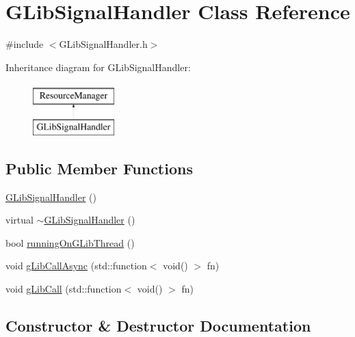 \hypertarget{classGLibSignalHandler}{}\section{G\+Lib\+Signal\+Handler Class Reference}
\label{classGLibSignalHandler}


{\ttfamily \#include $<$G\+Lib\+Signal\+Handler.\+h$>$}

Inheritance diagram for G\+Lib\+Signal\+Handler\+:\begin{figure}[H]
\begin{center}
\leavevmode
\includegraphics[height=2.000000cm]{classGLibSignalHandler}
\end{center}
\end{figure}
\subsection*{Public Member Functions}
\begin{DoxyCompactItemize}
\item 
\mbox{\hyperlink{classGLibSignalHandler_ae99630e0eb20b2f755187a48dcc9b814}{G\+Lib\+Signal\+Handler}} ()
\item 
virtual \mbox{\hyperlink{classGLibSignalHandler_a026fd58f52f4b6a3cc51bf0a329d89fe}{$\sim$\+G\+Lib\+Signal\+Handler}} ()
\item 
bool \mbox{\hyperlink{classGLibSignalHandler_a9456898f16d7cb736a591099187637e4}{running\+On\+G\+Lib\+Thread}} ()
\item 
void \mbox{\hyperlink{classGLibSignalHandler_a4d9f6408798f02a193ac21847712f981}{g\+Lib\+Call\+Async}} (std\+::function$<$ void() $>$ fn)
\item 
void \mbox{\hyperlink{classGLibSignalHandler_a3784efcec39f3f007c06f0f88cda794d}{g\+Lib\+Call}} (std\+::function$<$ void() $>$ fn)
\end{DoxyCompactItemize}


\subsection{Constructor \& Destructor Documentation}
\mbox{\label{classGLibSignalHandler_ae99630e0eb20b2f755187a48dcc9b814}} 
